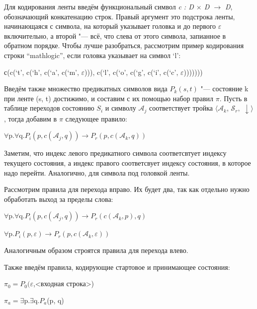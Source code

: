 Для кодирования ленты введём функциональный символ \textit{c : D $\times$ D $\rightarrow$ D}, обозначающий
конкатенацию строк. Правый аргумент это подстрока ленты, начинающаяся с символа, на который указывает
головка и до первого $\varepsilon$ включительно, а второй "--- всё, что слева от этого символа, запианное
в обратном порядке. Чтобы лучше разобраться, рассмотрим пример кодирования строки ``mathlogic'', если
головка указывает на символ `l':

\begin{center}
        с(c(`t', c(`h', c(`a', c(`m', $\varepsilon$))), 
        c(`l', c(`o', c(`g', c(`i', c(`c', $\varepsilon$)))))))
\end{center}

Введём также множество предикатных символов вида $P_k(s, t)$ "--- состояние k при ленте (s, t) достижимо,
и составим с их помощью набор правил $\pi$. Пусть в таблице переходов состоянию $S_i$ и символу
$\mathcal{A}_j$ соответствует тройка $\langle\mathcal{A}_k$,  $\mathcal{S}_r,$ $\downarrow\rangle$, тогда
добавим в $\pi$ следующее правило:

\begin{center}
    $\forall$p.$\forall$q.$P_i(p, c(\mathcal{A}_j, q))\to P_r(p, c(\mathcal{A}_k, q))$
\end{center}

Заметим, что индекс левого предикатного символа соответсвтует индексу текущего состояния, а индекс
правого соответсвует индексу состояния, в которое надо перейти. Аналогично, для символа под головкой
ленты.

Рассмотрим правила для перехода вправо. Их будет два, так как отдельно нужно обработать
выход за пределы слова:
\begin{center}
    $\forall$p.$\forall$q.$P_i(p, c(\mathcal{A}_j, q))\to P_r(c(\mathcal{A}_k, p), q)$
    
    $\forall$p.$P_i(p, \varepsilon)\to P_r(p, c(\mathcal{A}_k, \varepsilon))$
\end{center}

Аналогичным образом строятся правила для перехода влево. 

Также введём правила, кодирующие стартовое и принимающее состояния:
\begin{center}
    $\pi_0=P_0(\varepsilon$,<входная строка>)
    
    $\pi_a=\exists$p.$\exists$q.$P_a$(p, q)
\end{center}

